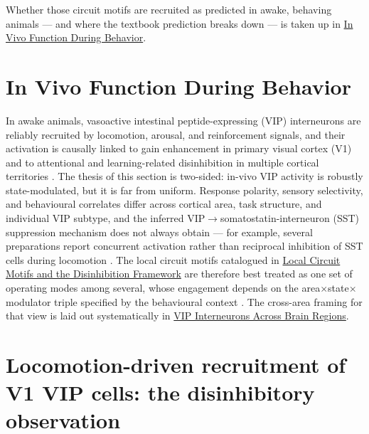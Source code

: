 \documentclass[11pt]{article}
\let\origrightarrow\rightarrow
\def\rightarrow{\ensuremath{\origrightarrow}}
\begin{document}
Whether those circuit motifs are recruited as predicted in awake, behaving animals --- and where the textbook prediction breaks down --- is taken up in \href{/in-vivo-behavior}{In Vivo Function During Behavior}.


\section{In Vivo Function During Behavior}
\label{sec:08_in_vivo_behavior}

In awake animals, vasoactive intestinal peptide-expressing (VIP) interneurons are reliably recruited by locomotion, arousal, and reinforcement signals, and their activation is causally linked to gain enhancement in primary visual cortex (V1) and to attentional and learning-related disinhibition in multiple cortical territories \citep{Fu2014, Pi2013, Lee2013, Kamigaki2017}. The thesis of this section is two-sided: in-vivo VIP activity is robustly state-modulated, but it is far from uniform. Response polarity, sensory selectivity, and behavioural correlates differ across cortical area, task structure, and individual VIP subtype, and the inferred VIP\rightarrow somatostatin-interneuron (SST) suppression mechanism does not always obtain --- for example, several preparations report concurrent activation rather than reciprocal inhibition of SST cells during locomotion \citep{Pakan2016, Dipoppa2018, Yavorska2021}. The local circuit motifs catalogued in \href{/disinhibition-framework}{Local Circuit Motifs and the Disinhibition Framework} are therefore best treated as one set of operating modes among several, whose engagement depends on the area$\times$state$\times$modulator triple specified by the behavioural context \citep{Garciajuncoclemente2017, Kannan2022}. The cross-area framing for that view is laid out systematically in \href{/cross-areas}{VIP Interneurons Across Brain Regions}.

\section{Locomotion-driven recruitment of V1 VIP cells: the disinhibitory observation}
\end{document}
